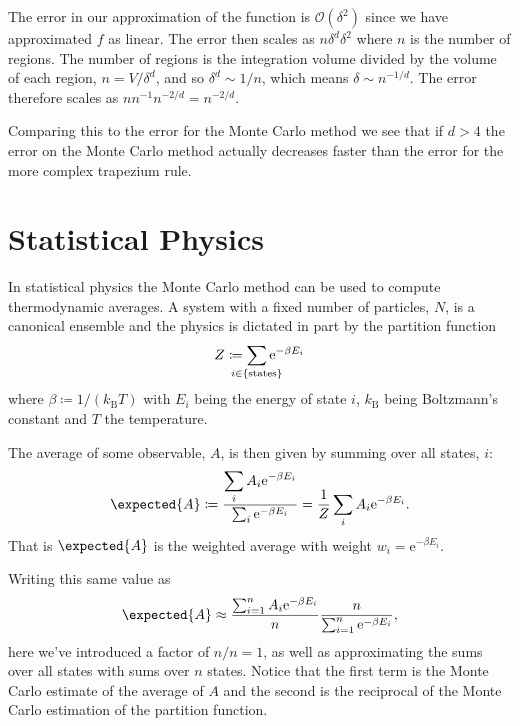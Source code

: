 \documentclass[fleqn]{NotesClass}
\newcommand*{\order}{\mathcal{O}}
\newcommand*{\e}{\mathrm{e}}
\newcommand*{\boltzmann}{k_{\mathrm{B}}}
\begin{document}
    The error in our approximation of the function is \(\order(\delta^2)\) since we have approximated \(f\) as linear.
    The error then scales as \(n \delta^d \delta^2\) where \(n\) is the number of regions.
    The number of regions is the integration volume divided by the volume of each region, \(n = V/\delta^d\), and so \(\delta^d \sim 1/n\), which means \(\delta \sim n^{-1/d}\).
    The error therefore scales as \(nn^{-1}n^{-2/d} = n^{-2/d}\).
    
    Comparing this to the error for the Monte Carlo method we see that if \(d > 4\) the error on the Monte Carlo method actually decreases faster than the error for the more complex trapezium rule.
    
    \section{Statistical Physics}
    In statistical physics the Monte Carlo method can be used to compute thermodynamic averages.
    A system with a fixed number of particles, \(N\), is a canonical ensemble and the physics is dictated in part by the partition function
    \begin{equation}
        Z \coloneqq \sum_{\mathclap{i \in \{\text{states}\}}} \e^{-\beta E_i}
    \end{equation}
    where \(\beta \coloneqq 1/(\boltzmann T)\) with \(E_i\) being the energy of state \(i\), \(\boltzmann\) being Boltzmann's constant and \(T\) the temperature.
    
    The average of some observable, \(A\), is then given by summing over all states, \(i\):
    \begin{equation}
        \expected{A} \coloneqq \frac{\displaystyle\sum_{i} A_i\e^{-\beta E_i}}{\sum_{i} \e^{-\beta E_i}} = \frac{1}{Z} \sum_{i} A_i\e^{-\beta E_i}.
    \end{equation}
    That is \(\expected{A}\) is the weighted average with weight \(w_i = \e^{-\beta E_i}\).
    
    Writing this same value as
    \begin{equation}
        \expected{A} \approx \frac{\sum_{i=1}^{n} A_i\e^{-\beta E_i}}{n} \frac{n}{\sum_{i=1}^{n} \e^{-\beta E_i}},
    \end{equation}
    here we've introduced a factor of \(n/n = 1\), as well as approximating the sums over all states with sums over \(n\) states.
    Notice that the first term is the Monte Carlo estimate of the average of \(A\) and the second is the reciprocal of the Monte Carlo estimation of the partition function.
    
\end{document}
